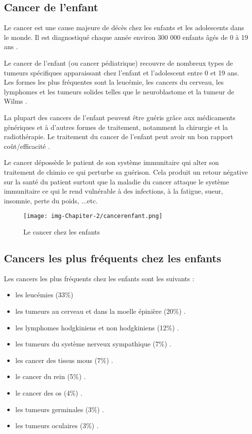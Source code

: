 \documentclass[12pt]{article}
\begin{document}
\subsection{Cancer de l’enfant}
Le cancer est une cause majeure de décès chez les enfants et les adolescents dans le monde. Il est diagnostiqué chaque année environ 300 000 enfants âgés de 0 à 19 ans \cite{32}.

Le cancer de l’enfant (ou cancer pédiatrique) recouvre de nombreux types de tumeurs spécifiques apparaissant chez l’enfant et l’adolescent entre 0 et 19 ans. Les formes les plus fréquentes sont la leucémie, les cancers du cerveau, les lymphomes et les tumeurs solides telles que le neuroblastome et la tumeur de Wilms \cite{32} \cite{33}.

La plupart des cancers de l’enfant peuvent être guéris grâce aux médicaments génériques et à d’autres formes de traitement, notamment la chirurgie et la radiothérapie. Le traitement du cancer de l’enfant peut avoir un bon rapport coût/efficacité \cite{33}.

Le cancer dépossède le patient de son système immunitaire qui alter son traitement de chimio ce qui perturbe sa guérison. Cela produit un retour négative sur la santé du patient surtout que la maladie du cancer attaque le système immunitaire ce qui le rend vulnérable à des infections, à la fatigue, sueur, insomnie, perte du poids, ...etc.

\begin{figure}[h]
\centering
\texttt{[image: img-Chapiter-2/cancerenfant.png]}
\caption{Le cancer chez les enfants}
\end{figure}

\subsection{Cancers les plus fréquents chez les enfants}
Les cancers les plus fréquents chez les enfants \cite{34} sont les suivants :
\begin{itemize}
	\item les leucémies (33\%)
	\item les tumeurs au cerveau et dans la moelle épinière (20\%) .
	\item les lymphomes hodgkiniens et non hodgkiniens (12\%) .
	\item les tumeurs du système nerveux sympathique (7\%) .
	\item les cancer des tissus mous (7\%) .
	\item le cancer du rein (5\%) .
	\item le cancer des os (4\%) .
	\item les tumeurs germinales (3\%) .
	\item les tumeurs oculaires (3\%) .
\end{itemize}
\end{document}
